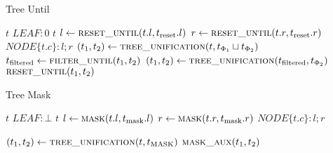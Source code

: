 \documentclass[11pt,a4paper,titlepage]{article}
\theoremstyle{definition}
\begin{document}
\begin{algorithm}                      
    \caption{Tree Until}         
    \label{alg:tree_until}       
    \begin{algorithmic}
                \State \Return $t$
                \State \Return $LEAF: 0$
                \State \Return $t$
            \Else
                \State $l \gets \Call{reset\_until}{t.l, t_{\text{reset}}.l}$
                \State $r \gets \Call{reset\_until}{t.r, t_{\text{reset}}.r}$
                \State \Return $NODE\{t.c \}: l ; r$
            \EndIf 
        \EndFunction
            \State $(t_1, t_2) \gets \Call{tree\_unification}{t, t_{\Phi_1} \sqcup t_{\Phi_2}}$
            \State $t_{\text{filtered}} \gets \Call{filter\_until}{t_1, t_2}$
            \State $(t_1, t_2) \gets \Call{tree\_unification}{t_{\text{filtered}}, t_{\Phi_2}}$
            \State \Return $\Call{reset\_until}{t_1, t_2}$
        \EndFunction
\end{algorithmic}
\end{algorithm}

\begin{algorithm}                      
    \caption{Tree Mask}         
    \label{alg:tree_mask}       
    \begin{algorithmic}

                    \State \Return $t$
                        \State \Return $LEAF: \bot$
                    \Else
                        \State \Return $t$
                    \EndIf
                \Else
                    \State $l \gets \Call{mask}{t.l, t_{\text{mask}}.l}$
                    \State $r \gets \Call{mask}{t.r, t_{\text{mask}}.r}$
                    \State \Return $NODE\{t.c \}: l ; r$
                \EndIf 
            \EndFunction

            \State $(t_1, t_2) \gets \Call{tree\_unification}{t, t_{\text{MASK}}}$
            \State \Return $\Call{mask\_aux}{t_1, t_2}$
        \EndFunction
\end{algorithmic}
\end{algorithm}
\end{document}
